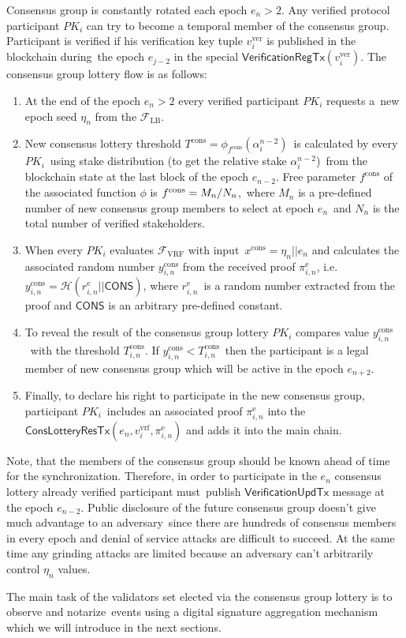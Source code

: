 Consensus group is constantly rotated each epoch ${e_n \gt 2}$.
Any verified protocol participant $PK_i$ can try to become a temporal member of the consensus group.
Participant is verified if his verification key tuple $v_i^{\text{ver}}$ is published in the blockchain during\
the epoch $e_{j-2}$ in the special $\textsf{VerificationRegTx}(v_i^{\text{ver}})$.
The consensus group lottery flow is as follows:
\begin{enumerate}
    \item At the end of the epoch ${e_n \gt 2}$ every verified participant $PK_i$ requests a\
    new epoch seed $\eta_n$ from the ${\mathcal{F}}_{\text{LB}}$.
    \item New consensus lottery threshold $T^{\text{cons}} = \phi_{f^{\text{cons}}}(\alpha^{n-2}_i)$\
    is calculated by every $PK_i$\ using stake distribution (to get the relative stake $\alpha^{n - 2}_{i}$)\
    from the blockchain state at the last block of the epoch $e_{n - 2}$.
    Free parameter $f^{\text{cons}}$ of the associated function $\phi$ is ${f^{\text{cons}} = M_n /\/ N_n}$,\
    where $M_n$ is a pre-defined number of new consensus group members to select at epoch $e_n$\
    and $N_n$ is the total number of verified stakeholders.
    \item When every $PK_i$ evaluates ${\mathcal{F}}_{\text{VRF}}$ with input\
    $x^{\text{cons}} = \eta_n || e_n $ and calculates the associated random number $y_{i, n}^{\text{cons}}$ from the received proof $\pi_{i, n}^{\text{e}}$, i.e.\
    ${y_{i, n}^{\text{cons}} = \mathcal{H}(r_{i, n}^{\text{e}}||\textsf{CONS})}$, where $r_{i, n}^{\text{e}}$\
    is a random number extracted from the proof and $\textsf{CONS}$ is an arbitrary pre-defined constant.
    \item To reveal the result of the consensus group lottery $PK_i$ compares value $y_{i, n}^{\text{cons}}$\
    with the threshold $T_{i, n}^{\text{cons}}$.
    If ${y_{i, n}^{\text{cons}} < T_{i, n}^{\text{cons}}}$\
    then the participant is a legal member of new consensus group which will be active in the epoch $e_{n+2}$.
    \item Finally, to declare his right to participate in the new consensus group, participant $PK_i$\
    includes an associated proof $\pi_{i, n}^{\text{e}}$ into the\
    $\textsf{ConsLotteryResTx}(e_n, v_i^{\text{vrf}}, \pi_{i, n}^{\text{e}})$ and adds it into the main chain.
\end{enumerate}
Note, that the members of the consensus group should be known ahead of time for the synchronization.
Therefore, in order to participate in the $e_n$ consensus lottery already verified participant must\
publish $\textsf{VerificationUpdTx}$ message at the epoch $e_{n-2}$.
Public disclosure of the future consensus group doesn't give much advantage to an adversary\
since there are hundreds of consensus members in every epoch and denial of service attacks are difficult to succeed.
At the same time any grinding attacks are limited because an adversary can't arbitrarily control $\eta_n$ values.

The main task of the validators set elected via the consensus group lottery is to observe and notarize\
events using a digital signature aggregation mechanism which we will introduce in the next sections.

